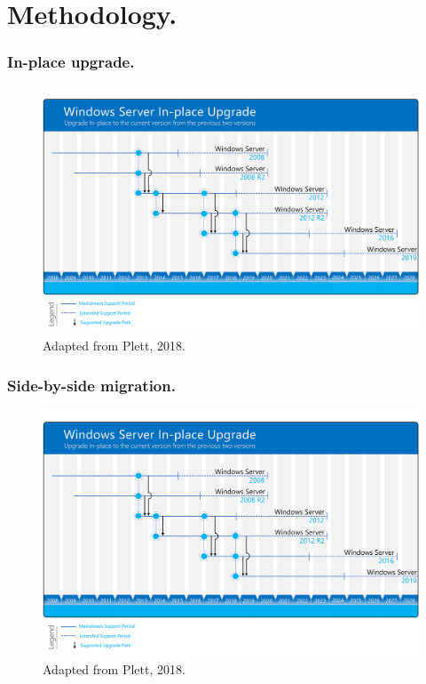 \documentclass[aspectratio=169]{beamer}
\begin{document}
\section{Methodology.}
\begin{frame}
\frametitle{In-place upgrade.}  
\vspace{0.5cm}
\begin{figure}
    \includegraphics[height=.8\textheight]{img/upgrade}
    \caption{Adapted from Plett, 2018.}
\end{figure}
\end{frame}
\begin{frame}
\frametitle{Side-by-side migration.}  
\vspace{0.5cm}
\begin{figure}
    \includegraphics[height=.8\textheight]{img/upgrade}
    \caption{Adapted from Plett, 2018.}
\end{figure}
\end{frame}
\end{document}
